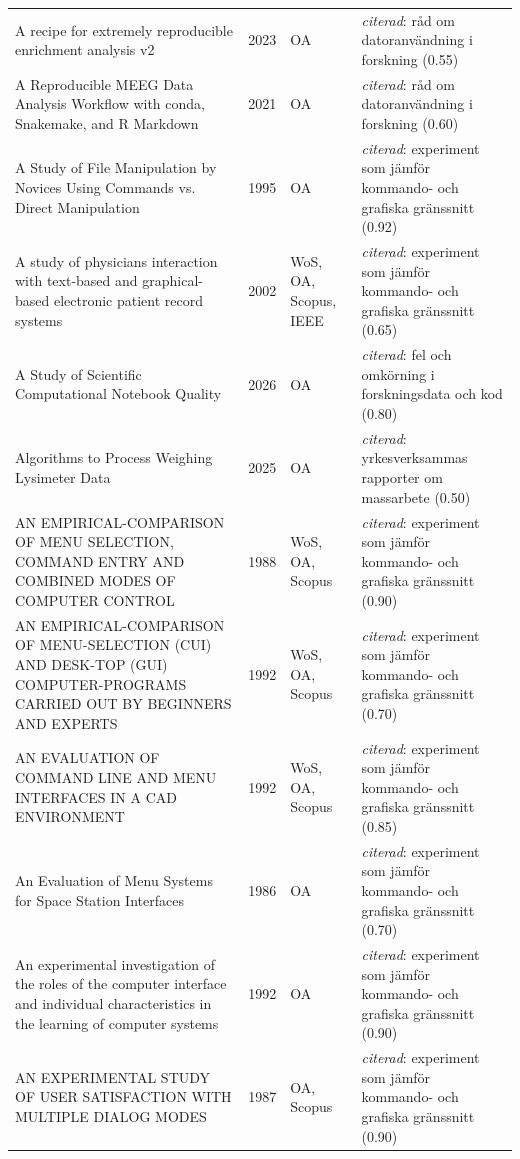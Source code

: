 \begin{longtable}{@{}%
  >{\raggedright\arraybackslash}p{}c%
  >{\raggedright\arraybackslash}p{}%
  >{\raggedright\arraybackslash}p{}@{}}
A recipe for extremely reproducible enrichment analysis v2 & 2023 & OA & \emph{citerad}: råd om datoranvändning i forskning (0.55) \\
A Reproducible MEEG Data Analysis Workflow with conda, Snakemake, and R Markdown & 2021 & OA & \emph{citerad}: råd om datoranvändning i forskning (0.60) \\
A Study of File Manipulation by Novices Using Commands vs. Direct Manipulation & 1995 & OA & \emph{citerad}: experiment som jämför kommando- och grafiska gränssnitt (0.92) \\
A study of physicians interaction with text-based and graphical-based electronic patient record systems & 2002 & WoS, OA, Scopus, IEEE & \emph{citerad}: experiment som jämför kommando- och grafiska gränssnitt (0.65) \\
A Study of Scientific Computational Notebook Quality & 2026 & OA & \emph{citerad}: fel och omkörning i forskningsdata och kod (0.80) \\
Algorithms to Process Weighing Lysimeter Data & 2025 & OA & \emph{citerad}: yrkesverksammas rapporter om massarbete (0.50) \\
AN EMPIRICAL-COMPARISON OF MENU SELECTION, COMMAND ENTRY AND COMBINED MODES OF COMPUTER CONTROL & 1988 & WoS, OA, Scopus & \emph{citerad}: experiment som jämför kommando- och grafiska gränssnitt (0.90) \\
AN EMPIRICAL-COMPARISON OF MENU-SELECTION (CUI) AND DESK-TOP (GUI) COMPUTER-PROGRAMS CARRIED OUT BY BEGINNERS AND EXPERTS & 1992 & WoS, OA, Scopus & \emph{citerad}: experiment som jämför kommando- och grafiska gränssnitt (0.70) \\
AN EVALUATION OF COMMAND LINE AND MENU INTERFACES IN A CAD ENVIRONMENT & 1992 & WoS, OA, Scopus & \emph{citerad}: experiment som jämför kommando- och grafiska gränssnitt (0.85) \\
An Evaluation of Menu Systems for Space Station Interfaces & 1986 & OA & \emph{citerad}: experiment som jämför kommando- och grafiska gränssnitt (0.70) \\
An experimental investigation of the roles of the computer interface and individual characteristics in the learning of computer systems & 1992 & OA & \emph{citerad}: experiment som jämför kommando- och grafiska gränssnitt (0.90) \\
AN EXPERIMENTAL STUDY OF USER SATISFACTION WITH MULTIPLE DIALOG MODES & 1987 & OA, Scopus & \emph{citerad}: experiment som jämför kommando- och grafiska gränssnitt (0.90) \\

\end{longtable}
